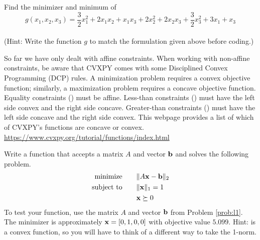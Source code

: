 \begin{problem}
Find the minimizer and minimum of
\begin{equation*}
g(x_1,x_2,x_3) = \frac{3}{2}x_1^2 +2x_1x_2 + x_1x_3+ 2x_2^2 +2x_2x_3+\frac{3}{2}x_3^2+3x_1 + x_3
\end{equation*}
\\(Hint: Write the function $g$ to match the formulation given above before coding.)
\begin{comment}
\begin{equation}
f(x) = \frac{1}{2}x\trp Qx - x\trp p
\end{equation}
where

\begin{center}
$Q =
\begin{bmatrix}
3 & 2 & 1\\
2 & 4 & 2\\
1 & 2 & 3\\
\end{bmatrix}
$
and $p =
\begin{bmatrix}
3\\
0\\
1\\
\end{bmatrix}
$
\end{center}
\end{comment}

\end{problem}

So far we have only dealt with affine constraints.
When working with non-affine constraints, be aware that CVXPY comes with some Disciplined Convex Programming (DCP) rules.
A minimization problem requires a convex objective function; similarly, a maximization problem requires a concave objective function.
Equality constraints (\li{==}) must be affine.
Less-than constraints (\li{<=}) must have the left side convex and the right side concave.
Greater-than constraints (\li{>=}) must have the left side concave and the right side convex.
This webpage provides a list of which of CVXPY's functions are concave or convex.
\url{https://www.cvxpy.org/tutorial/functions/index.html}

\begin{problem}
Write a function that accepts  a matrix $A$ and vector $\mathbf{b}$ and solves the following problem.
\begin{align*}
\text{minimize}\qquad &\|A\mathbf{x} - \mathbf{b}\|_2\\
\text{subject to}\qquad &\|\mathbf{x}\|_1 = 1\\
		&\mathbf{x} \succeq 0\\
\end{align*}
To test your function, use the matrix $A$ and vector $\mathbf{b}$ from Problem \ref{prob:l1}. 
The minimizer is approximately $\mathbf{x}=[0, 1, 0, 0]$ with objective value $5.099$.
Hint:  is a convex function, so you will have to think of a different way to take the 1-norm.
\end{problem}


